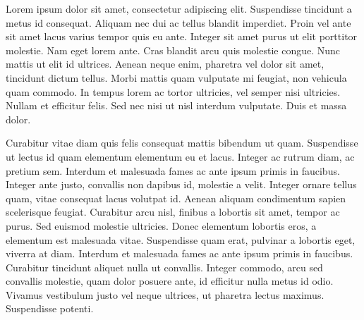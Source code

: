 \documentclass[a4paper,12pt]{article}
\newenvironment{env}
    {\color{bluedark}}
    {}
\begin{document}

\begin{env}
Lorem ipsum dolor sit amet, consectetur adipiscing elit. Suspendisse tincidunt a metus id consequat. Aliquam nec dui ac tellus blandit imperdiet. Proin vel ante sit amet lacus varius tempor quis eu ante. Integer sit amet purus ut elit porttitor molestie. Nam eget lorem ante. Cras blandit arcu quis molestie congue. Nunc mattis ut elit id ultrices. Aenean neque enim, pharetra vel dolor sit amet, tincidunt dictum tellus. Morbi mattis quam vulputate mi feugiat, non vehicula quam commodo. In tempus lorem ac tortor ultricies, vel semper nisi ultricies. Nullam et efficitur felis. Sed nec nisi ut nisl interdum vulputate. Duis et massa dolor.
\end{env}

Curabitur vitae diam quis felis consequat mattis bibendum ut quam. Suspendisse ut lectus id quam elementum elementum eu et lacus. Integer ac rutrum diam, ac pretium sem. Interdum et malesuada fames ac ante ipsum primis in faucibus. Integer ante justo, convallis non dapibus id, molestie a velit. Integer ornare tellus quam, vitae consequat lacus volutpat id. Aenean aliquam condimentum sapien scelerisque feugiat. Curabitur arcu nisl, finibus a lobortis sit amet, tempor ac purus. Sed euismod molestie ultricies. Donec elementum lobortis eros, a elementum est malesuada vitae. Suspendisse quam erat, pulvinar a lobortis eget, viverra at diam. Interdum et malesuada fames ac ante ipsum primis in faucibus. Curabitur tincidunt aliquet nulla ut convallis. Integer commodo, arcu sed convallis molestie, quam dolor posuere ante, id efficitur nulla metus id odio. Vivamus vestibulum justo vel neque ultrices, ut pharetra lectus maximus. Suspendisse potenti.
\end{document}
